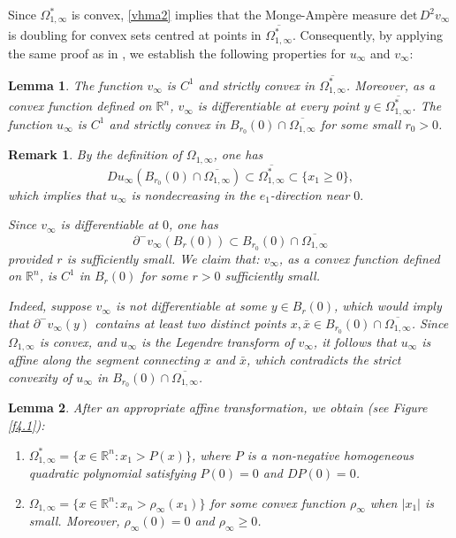 \documentclass[11pt]{amsart}
\theoremstyle{plain}
\newtheorem{lemma}{Lemma}[section]
\newtheorem{remark}{Remark}[section]
\renewcommand{\det}{\mbox{det}}
\newcommand{\0}{\textbf{0}}
\numberwithin{equation}{section}
\numberwithin{equation}{section}
\numberwithin{figure}{section}
\begin{document}
Since $\Omega_{1,\infty}^*$ is convex, \eqref{vhma2} implies that the Monge-Amp\`ere measure $\det\, D^2v_\infty$ is doubling for convex sets centred at points in $\overline{\Omega_{1,\infty}^*}$. Consequently, by applying the same proof as in \cite[Lemma 5.17]{CLW3}, we establish the following properties for $u_\infty$ and $v_\infty$:
\begin{lemma}\label{uvreg1}
The function $v_\infty$ is $C^1$ and strictly convex in $\overline{\Omega_{1,\infty}^*}$. Moreover, as a convex function defined on $\mathbb{R}^n$, $v_\infty$ is differentiable at every point $y \in \overline{\Omega_{1,\infty}^*}$. The function $u_\infty$ is $C^1$ and strictly convex in $B_{r_0}(0)\cap \overline{\Omega_{1,\infty}}$ for some small $r_0>0$.
\end{lemma}
\begin{remark}\label{uinfty1}
\emph{
By the definition of $\Omega_{1,\infty}$, one has 
	$$Du_\infty(B_{r_0}(0) \cap \overline{\Omega_{1,\infty}}) \subset\overline{\Omega_{1,\infty}^*} \subset \{x_1 \geq 0\},$$ 
which implies that $u_\infty$ is nondecreasing in the $e_1$-direction near $0.$ }

\emph{ Since \( v_\infty \) is differentiable at \( 0 \), one has
\[
\partial^- v_\infty(B_r(0)) \subset B_{r_0}(0) \cap \overline{\Omega_{1,\infty}}
\]
provided \( r \) is sufficiently small. 
We \emph{claim} that: \( v_\infty \), as a convex function defined on \( \mathbb{R}^n \), is \( C^1 \) in \( B_{r}(0) \) for some \( r > 0 \) sufficiently small. }

\emph{ Indeed, suppose \( v_\infty \) is not differentiable at some \( y \in B_r(0) \), which would imply that \( \partial^- v_\infty(y) \) contains at least two distinct points $x, \bar{x} \in B_{r_0}(0) \cap \overline{\Omega_{1,\infty}}$. 
Since $\Omega_{1,\infty}$ is convex, and $u_\infty$ is the Legendre transform of \( v_\infty \), it follows that \( u_\infty \) is affine along the segment connecting \( x \) and \( \bar{x} \), which contradicts the strict convexity of \( u_\infty \) in \( B_{r_0}(0) \cap \overline{\Omega_{1,\infty}} \).  }
\end{remark}
 



\begin{lemma}\label{gdspl1}
After an appropriate affine transformation, we obtain (see Figure \ref{f4.1}):
\begin{enumerate}
\item $\Omega_{1,\infty}^* = \{x \in \mathbb{R}^n: x_1 > P(x)\}$, where $P$ is a non-negative homogeneous quadratic polynomial satisfying $P(0) = 0$ and $DP(0) = 0$.
\item $\Omega_{1,\infty} = \{x \in \mathbb{R}^n: x_n > \rho_\infty(x_1)\}$ for some convex function $\rho_{\infty}$ when $|x_1|$ is small. Moreover, $\rho_\infty(0) = 0$ and $\rho_\infty \geq 0$.
\end{enumerate}
\end{lemma}
\end{document}
